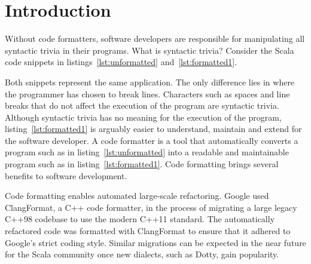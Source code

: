\section{Introduction} %
\label{sec:Introduction}
\lstset{style=scala}
Without code formatters, software developers are responsible for manipulating all syntactic trivia in their programs.
What is syntactic trivia?
Consider the Scala code snippets in listings~\ref{lst:unformatted} and~\ref{lst:formatted1}.

\begin{minipage}{.45\textwidth}

\end{minipage}
\hfil
\begin{minipage}{.45\textwidth}

\end{minipage}

Both snippets represent the same application.
The only difference lies in where the programmer has chosen to break lines.
Characters such as spaces and line breaks that do not affect the execution of the program are syntactic trivia.
Although syntactic trivia has no meaning for the execution of the program, listing~\ref{lst:formatted1} is arguably easier to understand, maintain and extend for the software developer.
A code formatter is a tool that automatically converts a program such as in listing~\ref{lst:unformatted} into a readable and maintainable program such as in listing~\ref{lst:formatted1}.
Code formatting brings several benefits to software development.

Code formatting enables automated large-scale refactoring.
Google used ClangFormat\autocite{jasper_clangformat_2013}, a C++ code formatter,
in the process of migrating a large legacy C++98 codebase to use the modern C++11 standard\autocite{wright_large-scale_2013}.
The automatically refactored code was formatted with ClangFormat to ensure that it adhered to Google's strict coding style\autocite{_google_????}.
Similar migrations can be expected in the near future for the Scala community once new dialects, such as Dotty\autocite{rompf_f_2015}, gain popularity.

